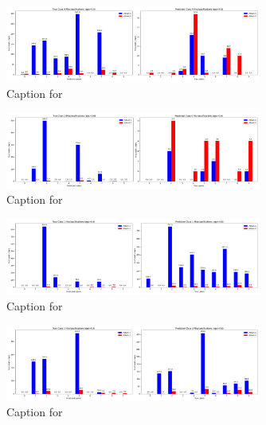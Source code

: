 \documentclass{article}
\begin{document}
\begin{figure}[!htbp]
\centering
\includegraphics[width=0.75\textwidth]{combined_class_boundary_pgd/combined_class_9_misclassifications_eps_0.5.png}
\caption{Caption for }
\label{fig:combined_class_9_misclassifications_eps_0.5.png}
\end{figure}



\begin{figure}[!htbp]
\centering
\includegraphics[width=0.75\textwidth]{combined_class_boundary_pgd/combined_class_0_misclassifications_eps_0.6.png}
\caption{Caption for }
\label{fig:combined_class_0_misclassifications_eps_0.6.png}
\end{figure}

\begin{figure}[!htbp]
\centering
\includegraphics[width=0.75\textwidth]{combined_class_boundary_pgd/combined_class_1_misclassifications_eps_0.6.png}
\caption{Caption for }
\label{fig:combined_class_1_misclassifications_eps_0.6.png}
\end{figure}

\begin{figure}[!htbp]
\centering
\includegraphics[width=0.75\textwidth]{combined_class_boundary_pgd/combined_class_3_misclassifications_eps_0.6.png}
\caption{Caption for }
\label{fig:combined_class_3_misclassifications_eps_0.6.png}
\end{figure}
\end{document}
